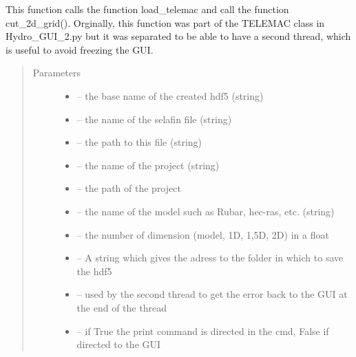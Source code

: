 \documentclass[letterpaper,10pt,english]{sphinxmanual}
\begin{document}
\begin{fulllineitems}
\label{\detokenize{index:src.selafin_habby1.load_telemac_and_cut_grid}}
This function calls the function load\_telemac and call the function cut\_2d\_grid(). Orginally, this function
was part of the TELEMAC class in Hydro\_GUI\_2.py but it was separated to be able to have a second thread, which
is useful to avoid freezing the GUI.
\begin{quote}\begin{description}
\item[{Parameters}] \leavevmode\begin{itemize}
\item {} 
 -- the base name of the created hdf5 (string)

\item {} 
 -- the name of the selafin file (string)

\item {} 
 -- the path to this file (string)

\item {} 
 -- the name of the project (string)

\item {} 
 -- the path of the project

\item {} 
 -- the name of the model such as Rubar, hec-ras, etc. (string)

\item {} 
 -- the number of dimension (model, 1D, 1,5D, 2D) in a float

\item {} 
 -- A string which gives the adress to the folder in which to save the hdf5

\item {} 
 -- used by the second thread to get the error back to the GUI at the end of the thread

\item {} 
 -- if True the print command is directed in the cmd, False if directed to the GUI

\end{itemize}

\end{description}\end{quote}

\end{fulllineitems}
\end{document}
